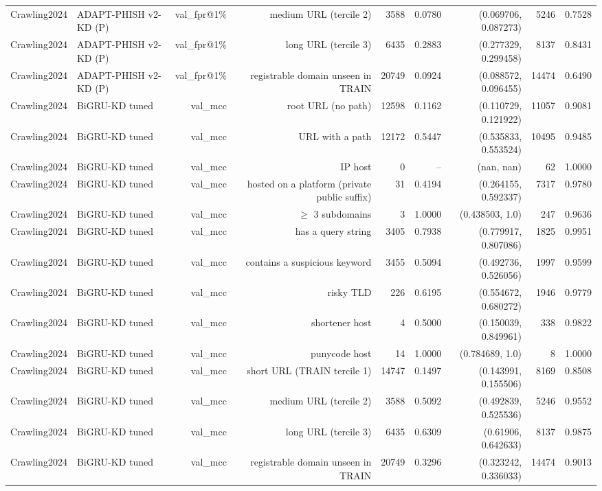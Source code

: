 \begin{table}[t]
\begin{tabular}{llrrrrrrr}
Crawling2024 & ADAPT-PHISH v2-KD (P) & val\_fpr@1\% & medium URL (tercile 2) & 3588 & 0.0780 & (0.069706, 0.087273) & 5246 & 0.7528 \\
Crawling2024 & ADAPT-PHISH v2-KD (P) & val\_fpr@1\% & long URL (tercile 3) & 6435 & 0.2883 & (0.277329, 0.299458) & 8137 & 0.8431 \\
Crawling2024 & ADAPT-PHISH v2-KD (P) & val\_fpr@1\% & registrable domain unseen in TRAIN & 20749 & 0.0924 & (0.088572, 0.096455) & 14474 & 0.6490 \\
Crawling2024 & BiGRU-KD tuned & val\_mcc & root URL (no path) & 12598 & 0.1162 & (0.110729, 0.121922) & 11057 & 0.9081 \\
Crawling2024 & BiGRU-KD tuned & val\_mcc & URL with a path & 12172 & 0.5447 & (0.535833, 0.553524) & 10495 & 0.9485 \\
Crawling2024 & BiGRU-KD tuned & val\_mcc & IP host & 0 & -- & (nan, nan) & 62 & 1.0000 \\
Crawling2024 & BiGRU-KD tuned & val\_mcc & hosted on a platform (private public suffix) & 31 & 0.4194 & (0.264155, 0.592337) & 7317 & 0.9780 \\
Crawling2024 & BiGRU-KD tuned & val\_mcc & $\geq$ 3 subdomains & 3 & 1.0000 & (0.438503, 1.0) & 247 & 0.9636 \\
Crawling2024 & BiGRU-KD tuned & val\_mcc & has a query string & 3405 & 0.7938 & (0.779917, 0.807086) & 1825 & 0.9951 \\
Crawling2024 & BiGRU-KD tuned & val\_mcc & contains a suspicious keyword & 3455 & 0.5094 & (0.492736, 0.526056) & 1997 & 0.9599 \\
Crawling2024 & BiGRU-KD tuned & val\_mcc & risky TLD & 226 & 0.6195 & (0.554672, 0.680272) & 1946 & 0.9779 \\
Crawling2024 & BiGRU-KD tuned & val\_mcc & shortener host & 4 & 0.5000 & (0.150039, 0.849961) & 338 & 0.9822 \\
Crawling2024 & BiGRU-KD tuned & val\_mcc & punycode host & 14 & 1.0000 & (0.784689, 1.0) & 8 & 1.0000 \\
Crawling2024 & BiGRU-KD tuned & val\_mcc & short URL (TRAIN tercile 1) & 14747 & 0.1497 & (0.143991, 0.155506) & 8169 & 0.8508 \\
Crawling2024 & BiGRU-KD tuned & val\_mcc & medium URL (tercile 2) & 3588 & 0.5092 & (0.492839, 0.525536) & 5246 & 0.9552 \\
Crawling2024 & BiGRU-KD tuned & val\_mcc & long URL (tercile 3) & 6435 & 0.6309 & (0.61906, 0.642633) & 8137 & 0.9875 \\
Crawling2024 & BiGRU-KD tuned & val\_mcc & registrable domain unseen in TRAIN & 20749 & 0.3296 & (0.323242, 0.336033) & 14474 & 0.9013 \\

\end{tabular}
\end{table}
